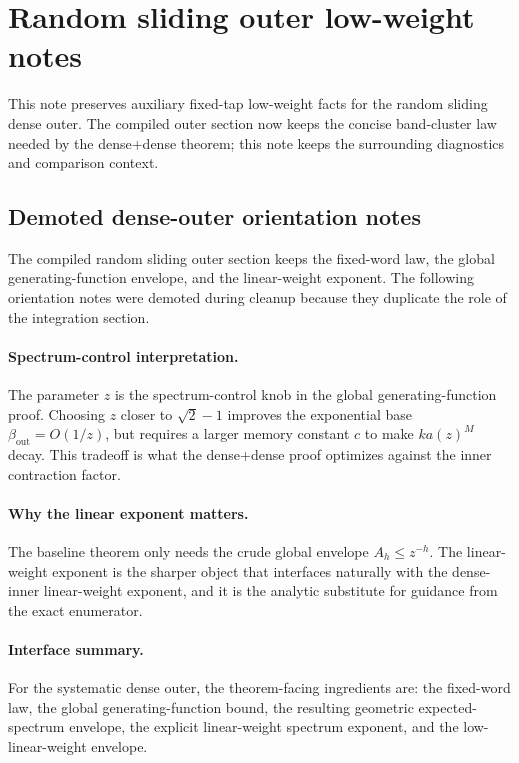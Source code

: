 \section{Random sliding outer low-weight notes}
\label{sec:random-sliding-outer-low-weight-notes}

This note preserves auxiliary fixed-tap low-weight facts for the random sliding
dense outer.  The compiled outer section now keeps the concise band-cluster law
needed by the dense+dense theorem; this note keeps the surrounding diagnostics
and comparison context.

\subsection{Demoted dense-outer orientation notes}

The compiled random sliding outer section keeps the fixed-word law, the global generating-function envelope, and the
linear-weight exponent.  The following orientation notes were demoted during cleanup because they duplicate the role of
the integration section.

\paragraph{Spectrum-control interpretation.}
The parameter \(z\) is the spectrum-control knob in the global generating-function proof.
Choosing \(z\) closer to \(\sqrt2-1\) improves the exponential base \(\beta_{\mathrm{out}}=O(1/z)\), but requires a
larger memory constant \(c\) to make \(ka(z)^M\) decay.
This tradeoff is what the dense+dense proof optimizes against the inner contraction factor.

\paragraph{Why the linear exponent matters.}
The baseline theorem only needs the crude global envelope \(A_h\le z^{-h}\).
The linear-weight exponent is the sharper object that interfaces naturally with the dense-inner linear-weight exponent,
and it is the analytic substitute for guidance from the exact enumerator.

\paragraph{Interface summary.}
For the systematic dense outer, the theorem-facing ingredients are: the fixed-word law, the global generating-function
bound, the resulting geometric expected-spectrum envelope, the explicit linear-weight spectrum exponent, and the
low-linear-weight envelope.

